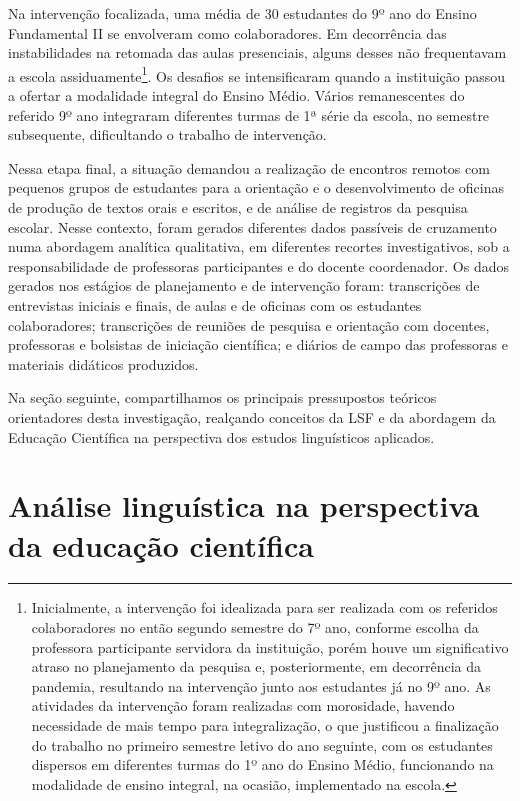 Na intervenção focalizada, uma média de 30 estudantes do 9º ano do
Ensino Fundamental II se envolveram como colaboradores. Em decorrência
das instabilidades na retomada das aulas presenciais, alguns desses não
frequentavam a escola assiduamente\footnote{ Inicialmente, a intervenção
	foi idealizada para ser realizada com os referidos colaboradores no
	então segundo semestre do 7º ano, conforme escolha da professora
	participante servidora da instituição, porém houve um significativo
	atraso no planejamento da pesquisa e, posteriormente, em decorrência
	da pandemia, resultando na intervenção junto aos estudantes já no 9º
	ano. As atividades da intervenção foram realizadas com morosidade,
	havendo necessidade de mais tempo para integralização, o que
	justificou a finalização do trabalho no primeiro semestre letivo do
	ano seguinte, com os estudantes dispersos em diferentes turmas do 1º
	ano do Ensino Médio, funcionando na modalidade de ensino integral, na
	ocasião, implementado na escola.}. Os desafios se intensificaram
quando a instituição passou a ofertar a modalidade integral do Ensino
Médio. Vários remanescentes do referido 9º ano integraram diferentes
turmas de 1ª série da escola, no semestre subsequente, dificultando o
trabalho de intervenção.



Nessa etapa final, a situação demandou a realização de encontros remotos
com pequenos grupos de estudantes para a orientação e o desenvolvimento
de oficinas de produção de textos orais e escritos, e de análise de
registros da pesquisa escolar. Nesse contexto, foram gerados diferentes
dados passíveis de cruzamento numa abordagem analítica qualitativa, em
diferentes recortes investigativos, sob a responsabilidade de
professoras participantes e do docente coordenador. Os dados gerados nos
estágios de planejamento e de intervenção foram: transcrições de
entrevistas iniciais e finais, de aulas e de oficinas com os estudantes
colaboradores; transcrições de reuniões de pesquisa e orientação com
docentes, professoras e bolsistas de iniciação científica; e diários de
campo das professoras e materiais didáticos produzidos.



Na seção seguinte, compartilhamos os principais pressupostos teóricos
orientadores desta investigação, realçando conceitos da LSF e da
abordagem da Educação Científica na perspectiva dos estudos linguísticos
aplicados.

\section{Análise linguística na perspectiva da educação científica}\label{sec-Análiselinguísticanaperspectivadaeducaçãocientífica}

